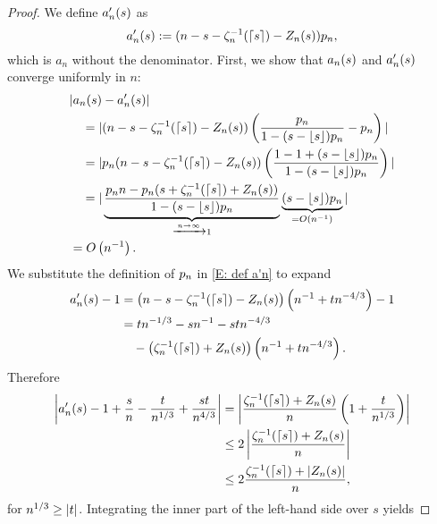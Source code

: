 \begin{proof} \label{P: limit An}
	We define $a'_n(s)$ as
	\begin{equation} \label{E: def a'n}
		a'_n(s) := (n - s - \zeta^{-1}_n(\lceil s\rceil) - Z_n(s)) p_n,
	\end{equation}
	which is $a_n$ without the denominator.
	First, we show that $a_n(s)$ and $a'_n(s)$ converge uniformly in $n$:
	\begin{equation} \label{E: convergence an amn}
	\begin{aligned}
	&|a_n(s) - a'_n(s)| \\
	&\quad = |(n - s - \zeta^{-1}_n(\lceil s\rceil) - Z_n(s)) \left( \frac{p_n}{1-(s-\lfloor s\rfloor)p_n} - p_n \right)| \\
	&\quad = |p_n(n - s - \zeta^{-1}_n(\lceil s\rceil) - Z_n(s)) \left( \frac{1 - 1 + (s - \lfloor s\rfloor)p_n}{1-(s - \lfloor s\rfloor)p_n} \right)| \\
	&\quad = |\underbrace{\frac{p_n n - p_n(s + \zeta^{-1}_n(\lceil s\rceil) + Z_n(s))}{1-(s - \lfloor s\rfloor)p_n}}_{\xrightarrow{n \rightarrow \infty} 1} 
		\underbrace{(s - \lfloor s\rfloor)p_n}_{=O\left(n^{-1}\right)} |\\
	&= O\left(n^{-1}\right).
	\end{aligned}
	\end{equation}
	We substitute the definition of $p_n$ in \eqref{E: def a'n} to expand
	\begin{align*}
	a'_n(s) - 1 
	&= \left( n - s - \zeta^{-1}_n(\lceil s\rceil) - Z_n(s) \right) \left( n^{-1} + tn^{-4 / 3} \right) - 1 \\
	&= tn^{-1 / 3} - sn^{-1} - stn^{-4 / 3} \\
	&\quad - \left( \zeta^{-1}_n(\lceil s\rceil) + Z_n(s) \right) \left( n^{-1} + tn^{-4 / 3} \right).
	\end{align*}
	Therefore
	\begin{equation} \label{E: an zeta Z / n} 
	\begin{aligned}
	\left| a'_n(s) - 1 + \frac{s}{n} - \frac{t}{n^{1 / 3}} + \frac{st}{n^{4 / 3}} \right|
	&= \left| \frac{\zeta^{-1}_n(\lceil s\rceil) + Z_n(s)}{n} \left( 1 + \frac{t}{n^{1 / 3}} \right) \right| \\
	&\leq 2 \left| \frac{\zeta^{-1}_n(\lceil s\rceil) + Z_n(s)}{n} \right| \\
	&\leq 2 \frac{\zeta^{-1}_n(\lceil s\rceil) + |Z_n(s)|}{n} ,  
	\end{aligned}
	\end{equation}
	for $n^{1 / 3} \geq |t|$.
	Integrating the inner part of the left-hand side over $s$ yields

\end{proof}
